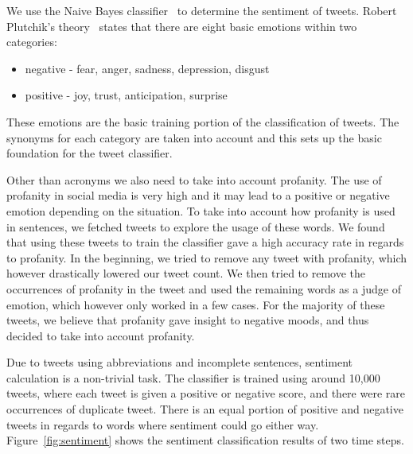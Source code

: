 We use the Naive Bayes classifier~\cite{pak2010twitter} to determine the sentiment of tweets. Robert Plutchik's theory~\cite{Plutchik2002} states that there are eight basic emotions within two categories:
\begin{itemize}
\vspace{-0.05in}
\setlength{\topsep}{-0.1in}
\setlength{\itemsep}{-0.05in}
\item negative - fear, anger, sadness, depression, disgust
\item positive - joy, trust, anticipation, surprise
\end{itemize}
\vspace{-0.05in}
These emotions are the basic training portion of the classification of tweets. The synonyms for each category are taken into account and this sets up the basic foundation for the tweet classifier.

Other than acronyms we also need to take into account profanity. The use of profanity in social media is very high and it may lead to a positive or negative emotion depending on the situation. To take into account how profanity is used in sentences, we fetched tweets to explore the usage of these words. We found that using these tweets to train the classifier gave a high accuracy rate in regards to profanity. In the beginning, we tried to remove any tweet with profanity, which however drastically lowered our tweet count. We then tried to remove the occurrences of profanity in the tweet and used the remaining words as a judge of emotion, which however only worked in a few cases. For the majority of these tweets, we believe that profanity gave insight to negative moods, and thus decided to take into account profanity.

Due to tweets using abbreviations and incomplete sentences, sentiment calculation is a non-trivial task. The classifier is trained using around 10,000 tweets, where each tweet is given a positive or negative score, and there were rare occurrences of duplicate tweet. There is an equal portion of positive and negative tweets in regards to words where sentiment could go either way. Figure~\ref{fig:sentiment} shows the sentiment classification results of two time steps.

